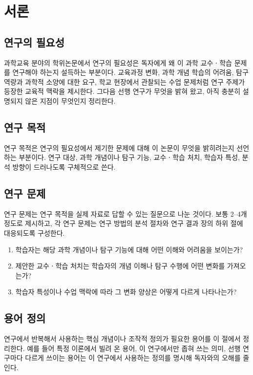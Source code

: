 \section{서론}


\subsection{연구의 필요성}

과학교육 분야의 학위논문에서 연구의 필요성은 독자에게 왜 이 과학 교수ㆍ학습 문제를 연구해야 하는지 설득하는 부분이다.
교육과정 변화, 과학 개념 학습의 어려움, 탐구 역량과 과학적 소양에 대한 요구, 학교 현장에서 관찰되는 수업 문제처럼 연구 주제가 등장한 교육적 맥락을 제시한다.
그다음 선행 연구가 무엇을 밝혀 왔고, 아직 충분히 설명되지 않은 지점이 무엇인지 정리한다.

\subsection{연구 목적}

연구 목적은 연구의 필요성에서 제기한 문제에 대해 이 논문이 무엇을 밝히려는지 선언하는 부분이다.
연구 대상, 과학 개념이나 탐구 기능, 교수ㆍ학습 처치, 학습자 특성, 분석 방향이 드러나도록 구체적으로 쓴다.

\subsection{연구 문제}

연구 문제는 연구 목적을 실제 자료로 답할 수 있는 질문으로 나눈 것이다.
보통 2--4개 정도로 제시하고, 각 연구 문제는 연구 방법의 분석 절차와 연구 결과 장의 하위 절에 대응되도록 구성한다.

\begin{enumerate}
    \item 학습자는 해당 과학 개념이나 탐구 기능에 대해 어떤 이해와 어려움을 보이는가?
    \item 제안한 교수ㆍ학습 처치는 학습자의 개념 이해나 탐구 수행에 어떤 변화를 가져오는가?
    \item 학습자 특성이나 수업 맥락에 따라 그 변화 양상은 어떻게 다르게 나타나는가?
\end{enumerate}

\subsection{용어 정의}

연구에서 반복해서 사용하는 핵심 개념이나 조작적 정의가 필요한 용어를 이 절에서 정리한다.
예를 들어 특정 이론에서 빌려 온 용어, 이 연구에서만 좁혀 쓰는 의미, 선행 연구마다 다르게 쓰이는 용어는 이 연구에서 사용하는 정의를 명시해 독자와의 오해를 줄인다.
